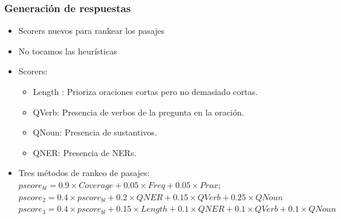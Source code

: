 \begin{frame}
\frametitle{Generación de respuestas}
  \begin{itemize}
    \item Scorers nuevos para rankear los pasajes
    \item No tocamos las heurísticas
    \item Scorers:
    \begin{itemize}
      \item Length : Prioriza oraciones cortas pero no demasiado cortas.
      \item QVerb: Presencia de verbos de la pregunta en la oración.
      \item QNoun: Presencia de sustantivos.
      \item QNER: Presencia de NERs.
      \end{itemize}
      \item Tres métodos de rankeo de pasajes: \newline
        $pscore_{bl} = 0.9 \times Coverage + 0.05 \times Freq + 0.05 \times Prox;$ \newline
        $pscore_2 = 0.4 \times pscore_{bl} + 0.2 \times QNER +  0.15 \times QVerb + 0.25 \times QNoun$ \newline
        $pscore_3 =  0.4 \times pscore_{bl} + 0.15 \times Length + 0.1 \times QNER + 0.1 \times QVerb + 0.1 \times QNoun$
  \end{itemize}
\end{frame}






